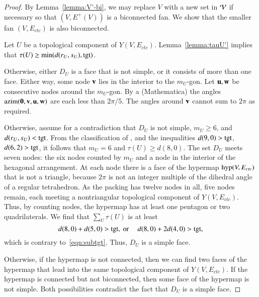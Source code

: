 \documentclass{llncs}
\def\op#1{{\hbox{#1}}}
\begin{document}
\begin{proof}
  By Lemma~\ref{lemma:V'-bi}, we may replace $V$ with a new set in
  ${\mathcal V}$ if necessary so that $(V,E^+(V))$ is a biconnected fan.
   We  show that the smaller
  fan $(V,E_{ctc})$ is also biconnected.

  Let $U$ be a topological component of $Y(V,E_{ctc})$.  Lemma~\ref{lemma:tauU'}
   implies that $\tau(U)\ge \min(d(r_U,s_U),\op{tgt})$.

    Otherwise,
   either $D_U$ is a face that is not simple, or it consists of more than
   one face.  Either way, some node ${\mathbf v}$ lies in the interior to the
   $m_U$-gon.  Let ${\mathbf u},{\mathbf w}$ be consecutive nodes around the $m_U$-gon.
   By a %
  {(Mathematica)} the angles
   $\op{azim}(\orz,\v,\u,\w)$ are each less than $2\pi/5$. The angles
   around ${\mathbf v}$ cannot sum to $2\pi$ as required.

     Otherwise, assume
   for a contradiction that $D_U$ is not simple, $m_U\ge 6$, and
   $d(r_U,s_U)<\op{tgt}$.  From the classification of
   \cite[p.~126,~Fig.~12.1]{Hales:2006:DCG}, and the inequalities
   $d(9,0) > \op{tgt}$, $d(6,2) > \op{tgt}$, it follows that 
    $m_U=6$ and $\tau(U)\ge d(8,0)$.  The set $D_U$ meets seven
   nodes: the six nodes counted by $m_U$ and a node in the interior of
   the hexagonal arrangement.  At each node there is a face of the
   hypermap $\op{hyp}(V,E_{ctc})$ that is not a triangle, because
   $2\pi$ is not an integer multiple of the dihedral angle of a
   regular tetrahedron.  As the packing has twelve nodes in all, five
   nodes remain, each meeting a nontriangular topological component of
   $Y(V,E_{ctc})$.  Thus, by counting nodes, the hypermap has at least
   one pentagon or two quadrilaterals.  We find that $\sum_{U}
   \tau(U)$ is at least
\[
d(8,0) + d(5,0) > \op{tgt}, \text{ or }\quad d(8,0) + 2 d(4,0) > \op{tgt},
\]
which is contrary to~\eqref{eqn:subtgt}.
Thus, $D_U$ is a simple face.
%
%

  Otherwise, if the hypermap is
not connected, then we can find two faces of the hypermap that lead
into the same topological component of $Y(V,E_{ctc})$.  If the
hypermap is connected but not biconnected, then some face of the
hypermap is not simple.  Both possibilities contradict the fact that
$D_U$ is a simple face.
\end{proof}
\end{document}
